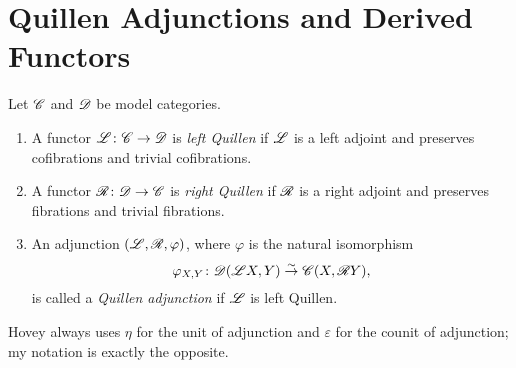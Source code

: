 \documentclass[10pt]{amsart}
\begin{document}
\section{Quillen Adjunctions and Derived Functors}
\begin{defn}
  Let $\mathscr{C}$ and $\mathscr{D}$ be model categories.
  \begin{enumerate}
  \item
    A functor $\mathscr{L} \colon \mathscr{C} \to \mathscr{D}$ is {\it left Quillen} if $\mathscr{L}$ is a left adjoint and preserves cofibrations and trivial cofibrations.
  \item
    A functor $\mathscr{R} \colon \mathscr{D} \to \mathscr{C}$ is {\it right Quillen} if $\mathscr{R}$ is a right adjoint and preserves fibrations and trivial fibrations.
  \item
    An adjunction $(\mathscr{L}, \mathscr{R}, \varphi)$, where $\varphi$ is the natural isomorphism 
    $$\varphi_{X,Y} \colon \mathscr{D}(\mathscr{L} X, Y) \overset{\sim}\to \mathscr{C}(X, \mathscr{R} Y),$$
    is called a {\it Quillen adjunction} if $\mathscr{L}$ is left Quillen.
  \end{enumerate}
\end{defn}

\begin{rmk}
  Hovey always uses $\eta$ for the unit of adjunction and $\varepsilon$ for the counit of adjunction; my notation is exactly the opposite.
\end{rmk}
\end{document}

